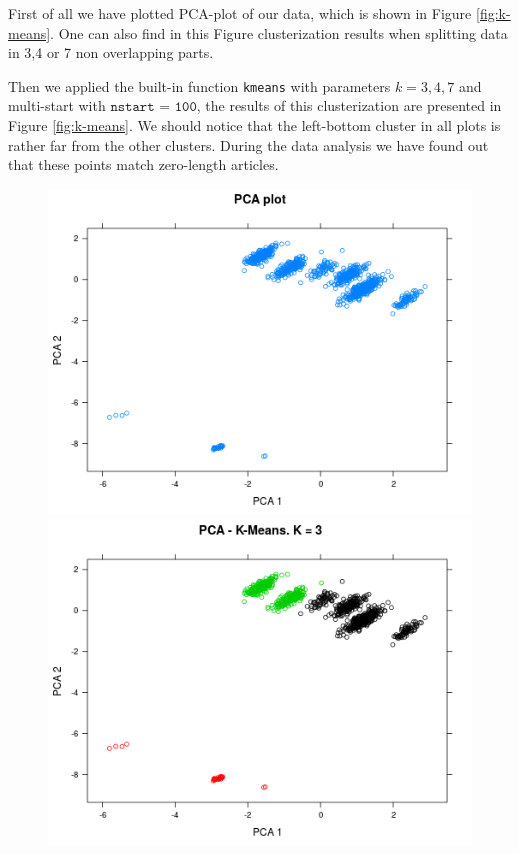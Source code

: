 First of all we have plotted PCA-plot of our data, which is shown in Figure \ref{fig:k-means}. One can also find in this Figure clusterization results   when splitting data in 3,4 or 7 non overlapping parts.

Then we applied the built-in function \texttt{kmeans} with parameters $k=3,4,7$ and multi-start with $\texttt{nstart = 100}$, the results of this clusterization are presented in Figure \ref{fig:k-means}.
We should notice that the left-bottom cluster in all plots is rather far from the other clusters. During the data analysis we have found out that these points match zero-length articles.  

\begin{figure}[h]
	\centering
	\begin{minipage}[h]{0.49\linewidth}
		\includegraphics[width=\linewidth]{images/pcaplot_km}
	\end{minipage}
	\hfill
	\begin{minipage}[h]{0.49\linewidth}
		\includegraphics[width=\linewidth]{images/kmean3}

\end{minipage}
\end{figure}
